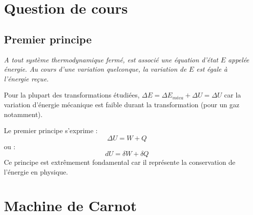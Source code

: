 \documentclass{report}
\begin{document}
\section*{Question de cours}

\subsection*{Premier principe}

\textit{A tout système thermodynamique fermé, est associé une équation d'état $E$ appelée énergie. Au cours d'une variation quelconque, la variation de $E$ est égale à l'énergie reçue.}

Pour la plupart des transformations étudiées, $\Delta E = \Delta E_{méca}+\Delta U =  \Delta U $ car la variation d'énergie mécanique est faible durant la transformation (pour un gaz notamment).

Le premier principe s'exprime :
\begin{equation}
	\Delta U = W+Q
\end{equation}
ou :
\begin{equation}
	d U = \delta W+ \delta Q
\end{equation}
Ce principe est extrêmement fondamental car il représente la conservation de l'énergie en physique.
 
\section*{Machine de Carnot}
\end{document}
